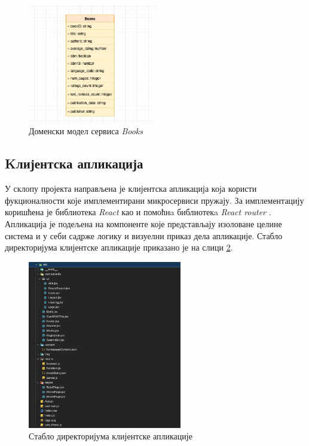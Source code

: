 \documentclass[12pt,oneside]{memoir}
\begin{document}
\begin{figure}[!ht]
  \centering
  \includegraphics[width=0.5\textwidth]{matfmaster/img/booksShema.png}
  \caption{Доменски модел сервиса \textit{Books}}
  \label{fig:booksShema}
\end{figure}
\newpage

\newpage


\subsection{Kлијентска апликација}

У склопу пројекта направљена је клијентска апликација која користи фукционалности које имплементирани микросервиси пружају. За имплементацију коришћена је библиотека \textit{React} као и помоћнa библиотекa \textit{React router} \cite{reactRouter}. Апликација је подељена на компоненте које представљају изоловане целине система и у себи садрже логику и визуелни приказ дела апликације. Стабло директоријума клијентске апликације приказано је на слици \ref{fig:clientTree}.

\begin{figure}[!ht]
  \centering
  \includegraphics[width=0.6\textwidth]{matfmaster/img/clientTree.png}
  \caption{Стабло директоријума клијентске апликације}
  \label{fig:clientTree}
\end{figure}
\end{document}

